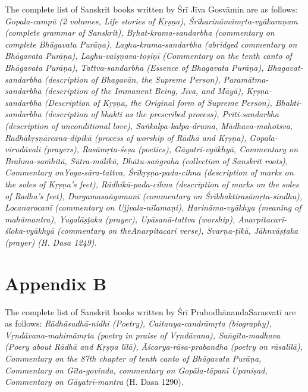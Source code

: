 The complete list of Sanskrit books written by Śrī Jīva Gosvāmin are as follows: {\sl  Gopala-campū {\rm (2 volumes, Life stories of Kṛṣṇa)}, Śrīharināmā\-mṛta-vyākaraṇam {\rm (complete grammar of Sanskrit)}, Bṛhat-krama-sanda\-rbha {\rm (commentary on complete {\sl Bhāgavata Purāṇa})}, Laghu-krama-\Break sandarbha {\rm (abridged commentary on {\sl Bhāgavata Purāṇa})}, Laghu-vai\-ṣṇa\-va-toṣiṇī {\rm (Commentary on the tenth canto of {\sl Bhāgavata Purāṇa})}, Tattva-sandarbha {\rm (Essence of {\sl Bhagavata Purāṇa})}, Bhagavat-sandarbha {\rm (description of Bhagavān, the Supreme Person)}, Paramātma-sandarbha {\rm (description of the Immanent Being, Jīva, and Māyā)}, Kṛṣṇa-sandarbha {\rm (Description of Kṛṣṇa, the Original form of Supreme Person)}, Bhakti-sandarbha {\rm (description of bhakti as the prescribed process)}, Prīti-sandarbha {\rm (description of unconditional love)}, Saṅkalpa-kalpa-druma, Mādhava-maho\-tsva, Radhākṛṣṇārcana-dipikā {\rm (process of worship of Rādhā and Kṛṣṇa)}, Gopala-virudāvali {\rm (prayers)}, Rasāmṛta-śeṣa {\rm (poetics)}, Gāyatrī-vyākhyā, Commentary on Brahma-saṁhitā, Sūtra-mālikā, Dhātu-saṅgraha {\rm (collection of Sanskrit roots)}, Commentary on\break Yoga-sāra-tattva, Śrīkṛṣṇa-pada-cihna {\rm (description of marks on the soles of Kṛṣṇa’s feet)}, Rādhikā-pada-cihna {\rm (description of marks on the soles of Radha’s feet)}, Durgamasaṅgamanī {\rm (commentary on {\sl Śrībhaktirasāmṛ\-ta-sindhu})}, Locanarocanī {\rm (commentary on {\sl Ujjvala-nīlamaṇi})}, Harināma-vyākhya  ({\rm meaning of} mahāmantra), Yugalāṣṭaka {\rm (prayer)}, Upāsanā-\Break tattva {\rm (worship)}, Anarpitacarī-śloka-vyākhyā {\rm (commentary on the\break Anarpitacari verse)}, Svarṇa-ṭīkā, Jāhnvāṣṭaka {\rm (prayer)} {\rm (H. Dasa 1249)}.} 

\section*{Appendix B}

{\rm The complete list of Sanskrit books written by Śrī Prabodhānanda\break Sarasvatī are as follows:} {\sl Rādhāsudhā-nidhi {\rm (Poetry)}, Caitanya-candrā\-mṛta {\rm (biography)}, Vṛndāvana-mahimāmṛta {\rm (poetry in praise of Vṛndāvana)}, Saṅgīta-madhava {\rm (Poery about Rādhā and Kṛṣṇa {\sl līlā})}, Āścarya-\Break rāsa-prabandha {\rm (poetry on {\sl rāsalīlā})}, {\rm Commentary on the 87th chapter of tenth canto of} Bhāgavata Purāṇa, {\rm Commentary on} Gīta-govinda, {\rm commentary on} Gopāla-tāpanī Upaniṣad, {\rm Commentary on} Gāyatrī-mantra} {\rm (H. Dasa 1290)}. 
\newpage

